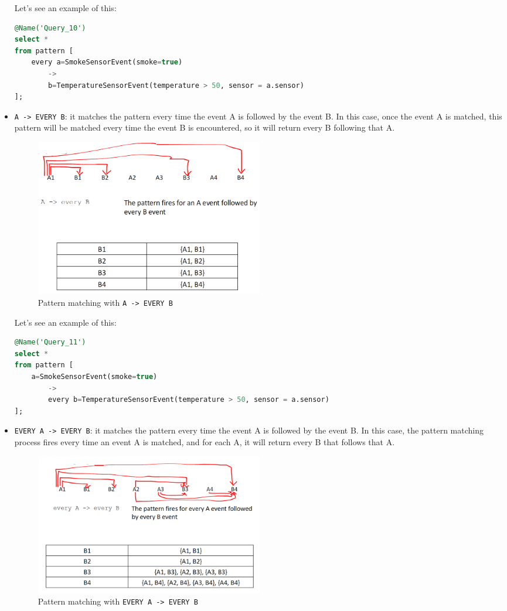 \begin{itemize}
    Let's see an example of this:\\

    \begin{lstlisting}[language=SQL]
@Name('Query_10')
select *
from pattern [
    every a=SmokeSensorEvent(smoke=true) 
        ->
        b=TemperatureSensorEvent(temperature > 50, sensor = a.sensor)
];
    \end{lstlisting}

    \item \texttt{A -> EVERY B}: it matches the pattern every time the event A is
    followed by the event B. In this case, once the event A is matched, this pattern
    will be matched every time the event B is encountered, so it will return every B
    following that A.

    \begin{figure}[H]
        \centering
        \includegraphics[width=0.5\textwidth]{figures/image_A_everyB.png}
        \caption{Pattern matching with \texttt{A -> EVERY B}}
        \label{fig:pattern_3}
    \end{figure}

    Let's see an example of this:\\

    \begin{lstlisting}[language=SQL]
@Name('Query_11')
select *
from pattern [
    a=SmokeSensorEvent(smoke=true) 
        ->
        every b=TemperatureSensorEvent(temperature > 50, sensor = a.sensor)
];
    \end{lstlisting}

    \item \texttt{EVERY A -> EVERY B}: it matches the pattern every time the event
    A is followed by the event B. In this case, the pattern matching process fires
    every time an event A is matched, and for each A, it will return every B that
    follows that A.

    \begin{figure}[H]
        \centering
        \includegraphics[width=0.5\textwidth]{figures/image_everyA_everyB.png}
        \caption{Pattern matching with \texttt{EVERY A -> EVERY B}}
        \label{fig:pattern_4}
    \end{figure}


\end{itemize}

